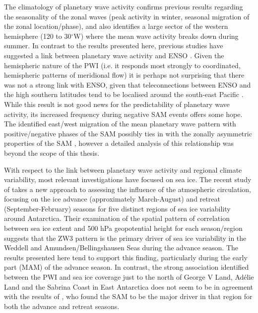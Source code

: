 The climatology of planetary wave activity confirms previous results regarding the seasonality of the zonal waves (peak activity in winter, seasonal migration of the zonal location/phase), and also identifies a large sector of the western hemisphere (120 to 30$^{\circ}$W) where the mean wave activity breaks down during summer. In contrast to the results presented here, previous studies have suggested a link between planetary wave activity and ENSO \citep[e.g.][]{Trenberth1980,Raphael2003,Hobbs2007}. Given the hemispheric nature of the PWI (i.e. it responds most strongly to coordinated, hemispheric patterns of meridional flow) it is perhaps not surprising that there was not a strong link with ENSO, given that teleconnections between ENSO and the high southern latitudes tend to be localised around the south-east Pacific \citep{Simmonds1995,Turner2004}. While this result is not good news for the predictability of planetary wave activity, its increased frequency during negative SAM events offers some hope. The identified east/west migration of the mean planetary wave pattern with positive/negative phases of the SAM possibly ties in with the zonally asymmetric properties of the SAM \citep[e.g.][]{Kidson1988,Kidston2009}, however a detailed analysis of this relationship was beyond the scope of this thesis.

With respect to the link between planetary wave activity and regional climate variability, most relevant investigations have focused on sea ice. The recent study of \citet{Raphael2014} takes a new approach to assessing the influence of the atmospheric circulation, focusing on the ice advance (approximately March-August) and retreat (September-February) seasons for five distinct regions of sea ice variability around Antarctica. Their examination of the spatial pattern of correlation between sea ice extent and 500 hPa geopotential height for each season/region suggests that the ZW3 pattern is the primary driver of sea ice variability in the Weddell and Amundsen/Bellingshausen Seas during the advance season. The results presented here tend to support this finding, particularly during the early part (MAM) of the advance season. In contrast, the strong association identified between the PWI and sea ice coverage just to the north of George V Land, Ad{\'e}lie Land and the Sabrina Coast in East Antarctica does not seem to be in agreement with the results of \citet{Raphael2014}, who found the SAM to be the major driver in that region for both the advance and retreat seasons.

